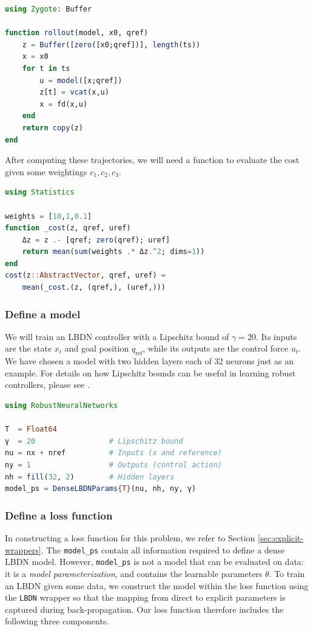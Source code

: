 \begin{lstlisting}[language = Julia]
using Zygote: Buffer

function rollout(model, x0, qref)
    z = Buffer([zero([x0;qref])], length(ts))
    x = x0
    for t in ts
        u = model([x;qref])
        z[t] = vcat(x,u)
        x = fd(x,u)
    end
    return copy(z)
end
\end{lstlisting}

After computing these trajectories, we will need a function to evaluate the cost given some weightings $c_1,c_2,c_3$.
\begin{lstlisting}[language = Julia]
using Statistics

weights = [10,1,0.1]
function _cost(z, qref, uref)
    Δz = z .- [qref; zero(qref); uref]
    return mean(sum(weights .* Δz.^2; dims=1))
end
cost(z::AbstractVector, qref, uref) = 
    mean(_cost.(z, (qref,), (uref,)))
\end{lstlisting}

\subsubsection{Define a model} \label{sec:rl-model}

We will train an LBDN controller with a Lipschitz bound of $\gamma = 20$. Its inputs are the state $x_t$ and goal position $q_\mathrm{ref}$, while its outputs are the control force $u_t$. We have chosen a model with two hidden layers each of 32 neurons just as an example. For details on how Lipschitz bounds can be useful in learning robust controllers, please see \cite{Barbara++2023}.

\begin{lstlisting}[language = Julia]
using RobustNeuralNetworks

T  = Float64
γ  = 20                 # Lipschitz bound
nu = nx + nref          # Inputs (x and reference)
ny = 1                  # Outputs (control action)
nh = fill(32, 2)        # Hidden layers
model_ps = DenseLBDNParams{T}(nu, nh, ny, γ)
\end{lstlisting}

\subsubsection{Define a loss function} \label{sec:rl-loss}

In constructing a loss function for this problem, we refer to Section \ref{sec:explicit-wrappers}. The \verb|model_ps| contain all information required to define a dense LBDN model. However, \verb|model_ps| is not a model that can be evaluated on data: it is a \textit{model parameterization}, and contains the learnable parameters $\theta$. To train an LBDN given some data, we construct the model within the loss function using the \verb|LBDN| wrapper so that the mapping from direct to explicit parameters is captured during back-propagation. Our loss function therefore includes the following three components.

